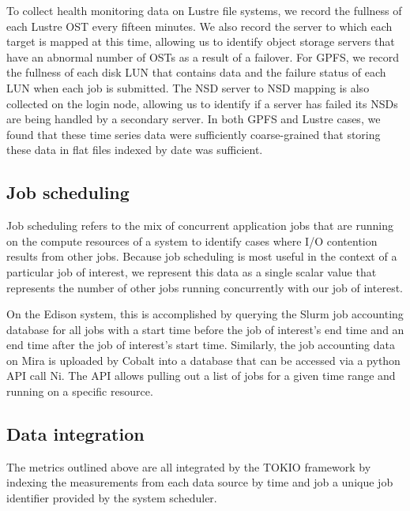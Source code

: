 To collect health monitoring data on Lustre file systems, we record the fullness of each Lustre OST every fifteen minutes.
We also record the server to which each target is mapped at this time, allowing us to identify object storage servers that have an abnormal number of OSTs as a result of a failover.
For GPFS, we record the fullness of each disk LUN that contains data and the failure status of each LUN when each job is submitted.
The NSD server to NSD mapping is also collected on the login node, allowing us to identify if a server has failed its NSDs are being handled by a secondary server.
In both GPFS and Lustre cases, we found that these time series data were sufficiently coarse-grained that storing these data in flat files indexed by date was sufficient.

\subsection{Job scheduling}

Job scheduling refers to the mix of concurrent application jobs that are running on the compute resources of a system to identify cases where I/O contention results from other jobs.
Because job scheduling is most useful in the context of a particular job of interest, we represent this data as a single scalar value that represents the number of other jobs running concurrently with our job of interest.

On the Edison system, this is accomplished by querying the Slurm job accounting database for all jobs with a start time before the job of interest's end time and an end time after the job of interest's start time.
Similarly, the job accounting data on Mira is uploaded by Cobalt into a database that can be accessed via a python API call Ni.
The API allows pulling out a list of jobs for a given time range and running on a specific resource.

\subsection{Data integration} \label{sec:data-integration}

The metrics outlined above are all integrated by the TOKIO framework by indexing the measurements from each data source by time and job a unique job identifier provided by the system scheduler.


